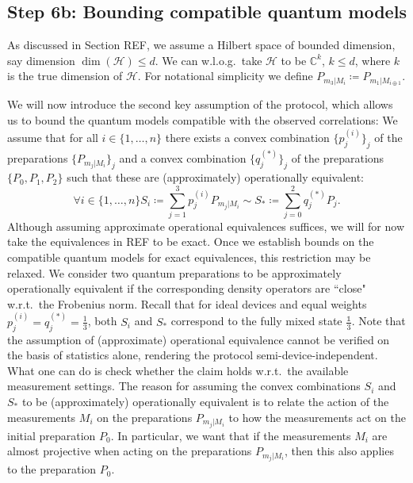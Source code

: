 \subsection{Step 6b: Bounding compatible quantum models}
As discussed in Section REF, we assume a Hilbert space of bounded dimension, say dimension $\operatorname{dim}(\mathcal{H})\leq d$. We can w.l.o.g.\ take $\mathcal{H}$ to be $\mathbb{C}^k$, $k\leq d$, where $k$ is the true dimension of $\mathcal{H}$. For notational simplicity we define $P_{m_3\vert M_i}\coloneqq P_{m_1\vert M_{i\oplus 1}}$.

We will now introduce the second key assumption of the protocol, which allows us to bound the quantum models compatible with the observed correlations: We assume that for all $i\in\{1,\dots,n\}$ there exists a convex combination $\{p_j^{(i)}\}_j$ of the preparations $\{P_{m_j\vert M_i}\}_j$ and a convex combination $\{q_j^{(*)}\}_j$ of the preparations $\{P_0,P_1,P_2\}$ such that these are (approximately) operationally equivalent:
\begin{equation}
\forall i\in\{1,\dots,n\} S_i \coloneqq \sum_{j=1}^3 p_j^{(i)}P_{m_j\vert M_i} \sim S_* \coloneqq \sum_{j=0}^2 q_j^{(*)}P_j.
\end{equation}
Although assuming approximate operational equivalences suffices, we will for now take the equivalences in REF to be exact. Once we establish bounds on the compatible quantum models for exact equivalences, this restriction may be relaxed. We consider two quantum preparations to be approximately operationally equivalent if the corresponding density operators are ``close" w.r.t.\ the Frobenius norm. Recall that for ideal devices and equal weights $p_j^{(i)}=q_j^{(*)}=\frac{1}{3}$, both $S_i$ and $S_{*}$ correspond to the fully mixed state $\frac{\mathbb{1}}{3}$. Note that the assumption of (approximate) operational equivalence cannot be verified on the basis of statistics alone, rendering the protocol semi-device-independent. What one can do is check whether the claim holds w.r.t.\ the available measurement settings. The reason for assuming the convex combinations $S_i$ and $S_{*}$ to be (approximately) operationally equivalent is to relate the action of the measurements $M_i$ on the preparations $P_{m_j\vert M_i}$ to how the measurements act on the initial preparation $P_0$. In particular, we want that if the measurements $M_i$ are almost projective when acting on the preparations $P_{m_j\vert M_i}$, then this also applies to the preparation $P_0$.

